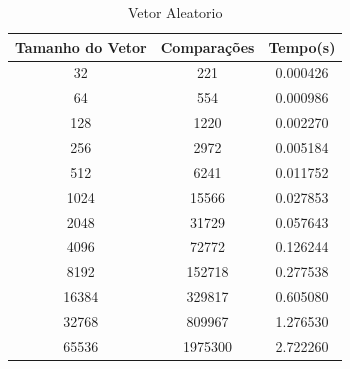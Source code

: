 \documentclass[12pt,a4paper,twoside]{report}
\begin{document}
\begin{table}[h]
  \centering
  \caption{Vetor Aleatorio \label{tab:aleatorio}}
  \begin{tabular}{ccc} \\\hline
  \textbf{Tamanho do Vetor} & \textbf{Comparações} & \textbf{Tempo(s)} \\\hline
  32                        & 221                 & 0.000426          \\\hline
  64                        & 554                 & 0.000986          \\\hline
  128                       & 1220                & 0.002270         \\\hline
  256                       &  2972               & 0.005184          \\\hline
  512                       &  6241                & 0.011752         \\\hline
  1024                      & 15566               & 0.027853         \\\hline
  2048                      &  31729              & 0.057643          \\\hline
  4096                      & 72772              & 0.126244         \\\hline
  8192                      & 152718             & 0.277538         \\\hline
  16384                     & 329817            & 0.605080       \\\hline
  32768                     & 809967            & 1.276530        \\\hline
  65536                     & 1975300            & 2.722260       \\\hline
  \end{tabular}
\end{table}
\end{document}
